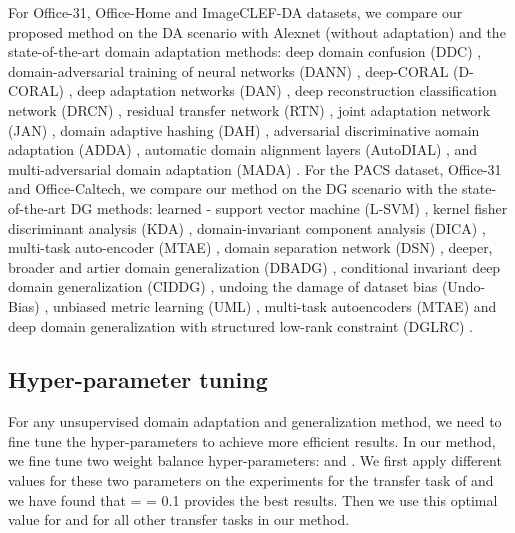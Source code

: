 \documentclass[review]{elsarticle}
\begin{document}
For Office-31, Office-Home and ImageCLEF-DA datasets, we compare our proposed method on the DA scenario with Alexnet (without adaptation) \cite{imagenet_cvpr09} and the state-of-the-art domain adaptation methods: deep domain confusion (DDC) \cite{DBLP:journals/corr/TzengHZSD14}, domain-adversarial training of neural networks (DANN) \cite{pmlr-v37-ganin15}, deep-CORAL (D-CORAL) \cite{dcoral}, deep adaptation networks (DAN) \cite{DBLP:conf/icml/LongC0J15}, deep reconstruction classification network (DRCN) \cite{DBLP:journals/corr/GhifaryKZBL16}, residual transfer network (RTN) \cite{DBLP:conf/nips/LongZ0J16}, joint adaptation network (JAN) \cite{DBLP:conf/icml/LongZ0J17}, domain adaptive hashing (DAH) \cite{venkateswara2017Deep}, adversarial discriminative aomain adaptation (ADDA) \cite{8099799}, automatic domain alignment layers (AutoDIAL) \cite{carlucci2017auto}, and multi-adversarial domain adaptation (MADA) \cite{mada2018}. For the PACS dataset, Office-31 and Office-Caltech, we compare our method on the DG scenario with the state-of-the-art DG methods: learned - support vector machine (L-SVM) \cite{DBLP:journals/jmlr/FanCHWL08}, kernel fisher discriminant analysis (KDA) \cite{812}, domain-invariant component analysis (DICA) \cite{Muandet:2013:DGV:3042817.3042820}, multi-task auto-encoder (MTAE) \cite{DBLP:conf/iccv/GhifaryKZB15}, domain separation network (DSN) \cite{Bousmalis:2016:DSN:3157096.3157135}, deeper, broader and artier domain generalization (DBADG) \cite{8237853}, conditional invariant deep domain generalization (CIDDG) \cite{Li2018eccv}, undoing the damage of dataset bias (Undo-Bias) \cite{Khosla:2012:UDD:2402940.2402953}, unbiased metric learning (UML) \cite{6751316}, multi-task autoencoders (MTAE) \cite{DBLP:conf/iccv/GhifaryKZB15} and deep domain generalization with structured low-rank constraint (DGLRC) \cite{8053784}.



\subsection{Hyper-parameter tuning}
\label{hyper}


For any unsupervised domain adaptation and generalization method, we need to fine tune the hyper-parameters to achieve more efficient results. In our method, we fine tune two weight balance hyper-parameters:  and . We first apply different values for these two parameters on the experiments for the transfer task of  and we have found that   =  = 0.1 provides the best results. Then we use this optimal value for  and  for all other transfer tasks in our method. 
\end{document}
